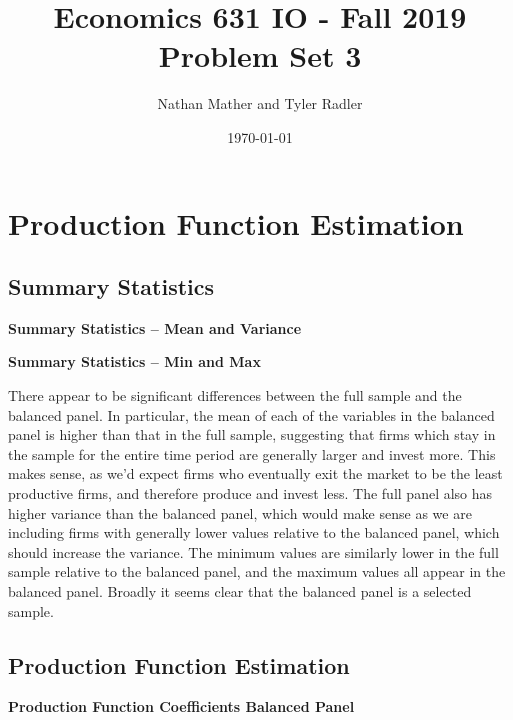 \documentclass{article}
\title{Economics 631 IO - Fall 2019\\Problem Set 3}
\author{Nathan Mather and Tyler Radler}
\date{\today}
\newcommand{\1}{\mathbbm{1}}
\begin{document}
\maketitle

\section{Production Function Estimation}

\subsection{Summary Statistics}

\begin{center}
	\centering
	\textbf{Summary Statistics -- Mean and Variance}\par\medskip
	\scalebox{1}{
		
	}
\end{center}

\begin{center}
	\centering
	\textbf{Summary Statistics -- Min and Max}\par\medskip
	\scalebox{1}{
		
	}
\end{center}

There appear to be significant differences between the full sample and the balanced panel. In particular, the mean of each of the variables in the balanced panel is higher than that in the full sample, suggesting that firms which stay in the sample for the entire time period are generally larger and invest more. This makes sense, as we'd expect firms who eventually exit the market to be the least productive firms, and therefore produce and invest less. The full panel also has higher variance than the balanced panel, which would make sense as we are including firms with generally lower values relative to the balanced panel, which should increase the variance. The minimum values are similarly lower in the full sample relative to the balanced panel, and the maximum values all appear in the balanced panel. Broadly it seems clear that the balanced panel is a selected sample.

\subsection{Production Function Estimation}

\begin{center}
	\centering
	\textbf{Production Function Coefficients Balanced Panel}\par\medskip
	\scalebox{1}{
		
	}
\end{center}
\end{document}
